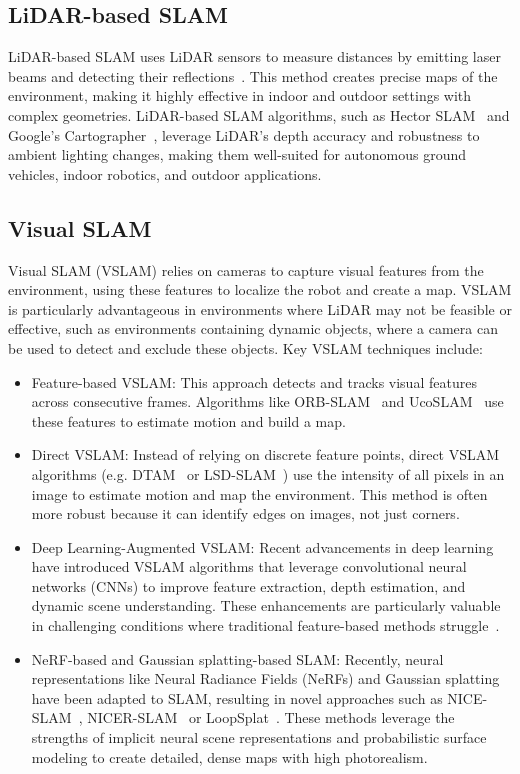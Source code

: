 \subsection{LiDAR-based SLAM}

LiDAR-based SLAM uses LiDAR sensors to measure distances by emitting laser beams and detecting their reflections~\cite{lidar}. This method creates precise maps of the environment, making it highly effective in indoor and outdoor settings with complex geometries. LiDAR-based SLAM algorithms, such as Hector SLAM~\cite{hector_slam} and Google’s Cartographer~\cite{google_cartographer}, leverage LiDAR's depth accuracy and robustness to ambient lighting changes, making them well-suited for autonomous ground vehicles, indoor robotics, and outdoor applications.

\subsection{Visual SLAM}

Visual SLAM (VSLAM) relies on cameras to capture visual features from the environment, using these features to localize the robot and create a map. VSLAM is particularly advantageous in environments where LiDAR may not be feasible or effective, such as environments containing dynamic objects, where a camera can be used to detect and exclude these objects. Key VSLAM techniques include:
\begin{itemize}
    \item Feature-based VSLAM: This approach detects and tracks visual features across consecutive frames. Algorithms like ORB-SLAM~\cite{orb_slam} and UcoSLAM~\cite{ucoslam} use these features to estimate motion and build a map.
    \item Direct VSLAM: Instead of relying on discrete feature points, direct VSLAM algorithms (e.g. DTAM~\cite{dtam} or LSD-SLAM~\cite{lsd_slam}) use the intensity of all pixels in an image to estimate motion and map the environment. This method is often more robust because it can identify edges on images, not just corners.
    \item Deep Learning-Augmented VSLAM: Recent advancements in deep learning have introduced VSLAM algorithms that leverage convolutional neural networks (CNNs) to improve feature extraction, depth estimation, and dynamic scene understanding. These enhancements are particularly valuable in challenging conditions where traditional feature-based methods struggle~\cite{deep_learning_vslam}.
    \item NeRF-based and Gaussian splatting-based SLAM: Recently, neural representations like Neural Radiance Fields (NeRFs) and Gaussian splatting have been adapted to SLAM, resulting in novel approaches such as NICE-SLAM~\cite{nice_slam}, NICER-SLAM~\cite{nicer_slam} or LoopSplat~\cite{loopsplat}. These methods leverage the strengths of implicit neural scene representations and probabilistic surface modeling to create detailed, dense maps with high photorealism.
\end{itemize}

